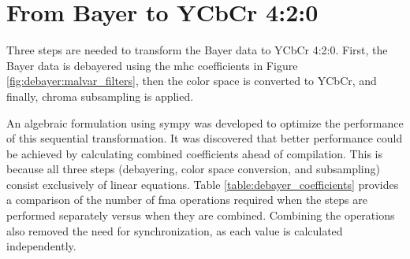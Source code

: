 \section{From Bayer to YCbCr 4:2:0}
\label{sec:bayertoycbcr}
Three steps are needed to transform the Bayer data to YCbCr 4:2:0.
First, the Bayer data is debayered using the \gls{mhc} coefficients in Figure \ref{fig:debayer:malvar_filters}, then the color space is converted to YCbCr, and finally, chroma subsampling is applied.

An algebraic formulation using \gls{sympy} was developed to optimize the performance of this sequential transformation.
It was discovered that better performance could be achieved by calculating combined coefficients ahead of compilation.
This is because all three steps (debayering, color space conversion, and subsampling) consist exclusively of linear equations.
Table \ref{table:debayer_coefficients} provides a comparison of the number of \gls{fma} operations required when the steps are performed separately versus when they are combined.
Combining the operations also removed the need for synchronization, as each value is calculated independently.


